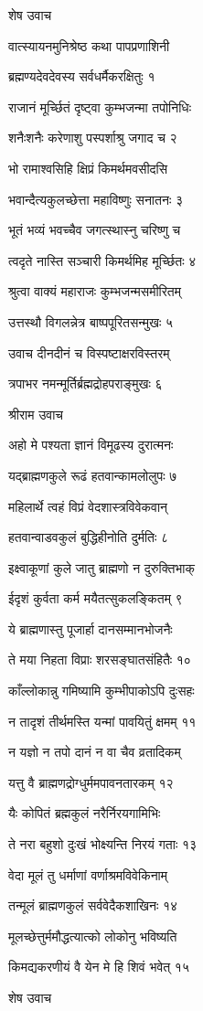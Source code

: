 शेष उवाच

वात्स्यायनमुनिश्रेष्ठ कथा पापप्रणाशिनी

ब्रह्मण्यदेवदेवस्य सर्वधर्मैकरक्षितुः १

राजानं मूर्च्छितं दृष्ट्वा कुम्भजन्मा तपोनिधिः

शनैःशनैः करेणाशु पस्पर्शाश्रु जगाद च २

भो रामाश्वसिहि क्षिप्रं किमर्थमवसीदसि

भवान्दैत्यकुलच्छेत्ता महाविष्णुः सनातनः ३

भूतं भव्यं भवच्चैव जगत्स्थास्नु चरिष्णु च

त्वदृते नास्ति सञ्चारी किमर्थमिह मूर्च्छितः ४

श्रुत्वा वाक्यं महाराजः कुम्भजन्मसमीरितम्

उत्तस्थौ विगलन्नेत्र बाष्पपूरितसन्मुखः ५

उवाच दीनदीनं च विस्पष्टाक्षरविस्तरम्

त्रपाभर नमन्मूर्तिर्ब्रह्मद्रोहपराङ्मुखः ६

श्रीराम उवाच

अहो मे पश्यता ज्ञानं विमूढस्य दुरात्मनः

यद्ब्राह्मणकुले रूढं हतवान्कामलोलुपः ७

महिलार्थे त्वहं विप्रं वेदशास्त्रविवेकवान्

हतवान्वाडवकुलं बुद्धिहीनोति दुर्मतिः ८

इक्ष्वाकूणां कुले जातु ब्राह्मणो न दुरुक्तिभाक्

ईदृशं कुर्वता कर्म मयैतत्सुकलङ्कितम् ९

ये ब्राह्मणास्तु पूजार्हा दानसम्मानभोजनैः

ते मया निहता विप्राः शरसङ्घातसंहितैः १०

काँल्लोकान्नु गमिष्यामि कुम्भीपाकोऽपि दुःसहः

न तादृशं तीर्थमस्ति यन्मां पावयितुं क्षमम् ११

न यज्ञो न तपो दानं न वा चैव व्रतादिकम्

यत्तु वै ब्राह्मणद्रोग्धुर्ममपावनतारकम् १२

यैः कोपितं ब्रह्मकुलं नरैर्निरयगामिभिः

ते नरा बहुशो दुःखं भोक्ष्यन्ति निरयं गताः १३

वेदा मूलं तु धर्माणां वर्णाश्रमविवेकिनाम्

तन्मूलं ब्राह्मणकुलं सर्ववेदैकशाखिनः १४

मूलच्छेत्तुर्ममौद्धत्यात्को लोकोनु भविष्यति

किमद्यकरणीयं वै येन मे हि शिवं भवेत् १५

शेष उवाच

